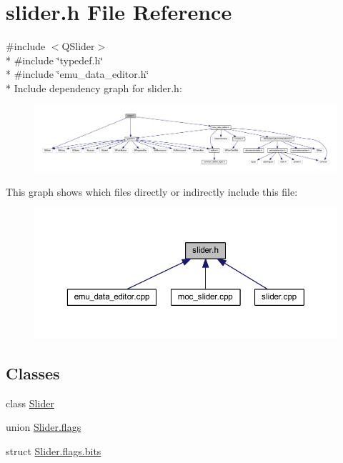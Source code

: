 \hypertarget{a00078}{\section{slider.\+h File Reference}
\label{a00078}
}
{\ttfamily \#include $<$Q\+Slider$>$}\\*
{\ttfamily \#include \char`\"{}typedef.\+h\char`\"{}}\\*
{\ttfamily \#include \char`\"{}emu\+\_\+data\+\_\+editor.\+h\char`\"{}}\\*
Include dependency graph for slider.\+h\+:
\nopagebreak
\begin{figure}[H]
\begin{center}
\leavevmode
\includegraphics[width=350pt]{df/d03/a00348}
\end{center}
\end{figure}
This graph shows which files directly or indirectly include this file\+:
\nopagebreak
\begin{figure}[H]
\begin{center}
\leavevmode
\includegraphics[width=350pt]{d7/dfc/a00349}
\end{center}
\end{figure}
\subsection*{Classes}
\begin{DoxyCompactItemize}
\item 
class \hyperlink{a00077}{Slider}
\item 
union \hyperlink{a00078_dd/df3/a00219}{Slider.\+flags}
\item 
struct \hyperlink{a00078_d5/d0b/a00220}{Slider.\+flags.\+bits}
\end{DoxyCompactItemize}

